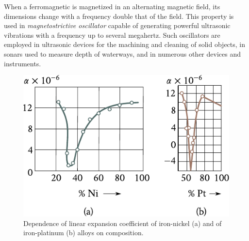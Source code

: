 When a ferromagnetic is magnetized in an alternating magnetic field, its dimensions change with a frequency double that of the field. This property is used in \textit{magnetostrictive oscillator} capable of generating powerful ultrasonic vibrations with a frequency up to several megahertz. Such oscillators are employed in ultrasonic devices for the machining and cleaning of solid objects, in sonars used to measure depth of waterways, and in numerous other devices and instruments.

\begin{figure}[t]
	\begin{center}
		\includegraphics[scale=1]{figures/ch_07/fig_7_8.pdf}
		\caption[]{Dependence of linear expansion coefficient of iron-nickel (a) and of iron-platinum (b) alloys on composition.}
		\label{fig:7_8}
	\end{center}
	\vspace{-0.7cm}
\end{figure}

